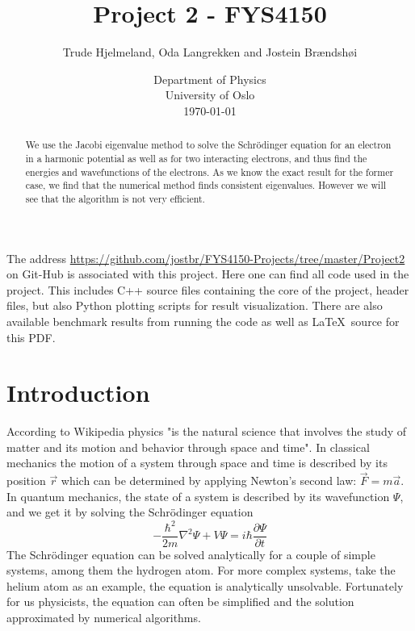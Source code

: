 \documentclass[12pt]{article}
\numberwithin{figure}{section}
\numberwithin{table}{section}
\begin{document}
\begin{titlepage}
\title{Project 2 - FYS4150}
\author{Trude Hjelmeland, Oda Langrekken and Jostein Brændshøi}
\date{%
    Department of Physics\\%
    University of Oslo\\[2ex]%
    \today
}
\clearpage
\maketitle
\thispagestyle{empty}

\begin{abstract}
\noindent We use the Jacobi eigenvalue method to solve the Schrödinger equation for an electron in a harmonic potential as well as for two interacting electrons, and thus find the energies and wavefunctions of the electrons. As we know the exact result for the former case, we find that the numerical method finds consistent eigenvalues. However we will see that the algorithm is not very efficient.
\end{abstract}
\vspace{2.00cm}

\noindent The address \url{https://github.com/jostbr/FYS4150-Projects/tree/master/Project2} on Git-Hub is associated with this project. Here one can find all code used in the project. This includes C++ source files containing the core of the project, header files, but also Python plotting scripts for result visualization. There are also available benchmark results from running the code as well as \LaTeX \ source for this PDF.

\end{titlepage}
\pagebreak


\section{Introduction}

\noindent  According to Wikipedia\cite{physics} physics  "is the natural science that involves the study of matter and its motion and behavior through space and time". In classical mechanics the motion of a system through space and time is described by its position $\vec{r}$ which can be determined by applying Newton's second law: $\vec{F}=m\vec{a}$. In quantum mechanics, the state of a system is described by its wavefunction $\Psi$, and we get it by solving the Schrödinger equation \cite{Qm}  $$-\frac{\hbar^2}{2m}\nabla^2\Psi+V\Psi=i\hbar \frac{\partial \Psi}{\partial t}$$
The Schrödinger equation can be solved analytically for a couple of simple systems, among them the hydrogen atom. For more complex systems, take the helium atom as an example, the equation is analytically unsolvable. Fortunately for us physicists, the equation can often be simplified and the solution approximated by numerical algorithms.   \\
\end{document}

